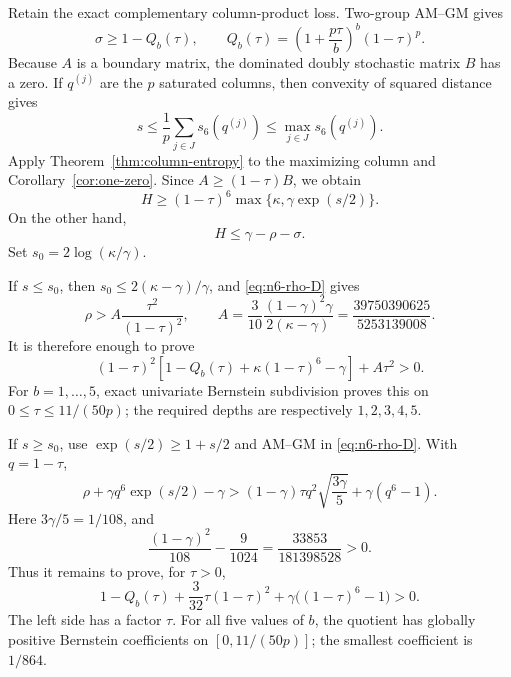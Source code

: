 \documentclass[11pt,a4paper]{article}
\numberwithin{equation}{section}
\theoremstyle{definition}
\newcommand{\1}{\mathbf{1}}
\begin{document}
Retain the exact complementary column-product loss.  Two-group AM--GM gives
\begin{equation}\label{eq:n6-sigma-exact}
 \sigma\ge1-Q_b(\tau),
 \qquad
 Q_b(\tau)=
 \left(1+\frac{p\tau}{b}\right)^b(1-\tau)^p.
\end{equation}
Because $A$ is a boundary matrix, the dominated doubly stochastic matrix
$B$ has a zero.  If $q^{(j)}$ are the $p$ saturated columns, then convexity
of squared distance gives
\[
 s\le\frac1p\sum_{j\in J}s_6(q^{(j)})
 \le\max_{j\in J}s_6(q^{(j)}).
\]
Apply Theorem~\ref{thm:column-entropy} to the maximizing column and
Corollary~\ref{cor:one-zero}.  Since $A\ge(1-\tau)B$, we obtain
\begin{equation}\label{eq:n6-one-sided-per-lower}
 H\ge(1-\tau)^6\max\{\kappa,\gamma\exp(s/2)\}.
\end{equation}
On the other hand,
\begin{equation}\label{eq:n6-one-sided-per-upper}
 H\le\gamma-\rho-\sigma.
\end{equation}
Set $s_0=2\log(\kappa/\gamma)$.

If $s\le s_0$, then
$s_0\le2(\kappa-\gamma)/\gamma$, and
\eqref{eq:n6-rho-D} gives
\begin{equation}\label{eq:n6-Aenergy}
 \rho>A\frac{\tau^2}{(1-\tau)^2},
 \qquad
 A=\frac{3}{10}\frac{(1-\gamma)^2\gamma}{2(\kappa-\gamma)}
 =\frac{39750390625}{5253139008}.
\end{equation}
It is therefore enough to prove
\begin{equation}\label{eq:n6-small-poly}
 (1-\tau)^2
 \left[1-Q_b(\tau)+\kappa(1-\tau)^6-\gamma\right]
 +A\tau^2>0.
\end{equation}
For $b=1,\dots,5$, exact univariate Bernstein subdivision proves this on
$0\le\tau\le11/(50p)$; the required depths are respectively
$1,2,3,4,5$.

If $s\ge s_0$, use $\exp(s/2)\ge1+s/2$ and AM--GM in
\eqref{eq:n6-rho-D}.  With $q=1-\tau$,
\[
 \rho+\gamma q^6\exp(s/2)-\gamma
 >(1-\gamma)\tau q^2\sqrt{\frac{3\gamma}{5}}
   +\gamma(q^6-1).
\]
Here $3\gamma/5=1/108$, and
\begin{equation}\label{eq:n6-large-gap}
 \frac{(1-\gamma)^2}{108}-\frac9{1024}
 =\frac{33853}{181398528}>0.
\end{equation}
Thus it remains to prove, for $\tau>0$,
\begin{equation}\label{eq:n6-large-poly}
 1-Q_b(\tau)+\frac3{32}\tau(1-\tau)^2
 +\gamma\bigl((1-\tau)^6-1\bigr)>0.
\end{equation}
The left side has a factor $\tau$.  For all five values of $b$, the quotient
has globally positive Bernstein coefficients on $[0,11/(50p)]$; the
smallest coefficient is $1/864$.
\end{document}
